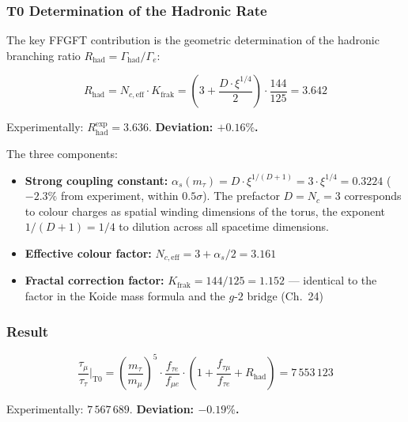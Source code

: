 	\subsubsection*{T0 Determination of the Hadronic Rate}
	
	The key FFGFT contribution is the geometric determination of the hadronic branching ratio \(R_\text{had} = \Gamma_\text{had}/\Gamma_e\):
	
	\begin{equation}
		\boxed{R_\text{had} = N_{c,\text{eff}} \cdot K_\text{frak} = \left(3 + \frac{D \cdot \xi^{1/4}}{2}\right) \cdot \frac{144}{125} = 3.642}
	\end{equation}
	
	Experimentally: \(R_\text{had}^\text{exp} = 3.636\). \textbf{Deviation: \(+0.16\%\).}
	
	The three components:
	
	\begin{itemize}
		\item \textbf{Strong coupling constant:} \(\alpha_s(m_\tau) = D \cdot \xi^{1/(D+1)} = 3 \cdot \xi^{1/4} = 0.3224\) (\(-2.3\%\) from experiment, within \(0.5\sigma\)). The prefactor \(D = N_c = 3\) corresponds to colour charges as spatial winding dimensions of the torus, the exponent \(1/(D+1) = 1/4\) to dilution across all spacetime dimensions.
		\item \textbf{Effective colour factor:} \(N_{c,\text{eff}} = 3 + \alpha_s/2 = 3.161\)
		\item \textbf{Fractal correction factor:} \(K_\text{frak} = 144/125 = 1.152\) — identical to the factor in the Koide mass formula and the \(g\)-\(2\) bridge (Ch.~24)
	\end{itemize}
	
	\subsubsection*{Result}
	
	\begin{equation}
		\frac{\tau_\mu}{\tau_\tau}\bigg|_\text{T0} = \left(\frac{m_\tau}{m_\mu}\right)^5 \cdot \frac{f_{\tau e}}{f_{\mu e}} \cdot \left(1 + \frac{f_{\tau\mu}}{f_{\tau e}} + R_\text{had}\right) = 7\,553\,123
	\end{equation}
	
	Experimentally: \(7\,567\,689\). \textbf{Deviation: \(-0.19\%\).}
	
